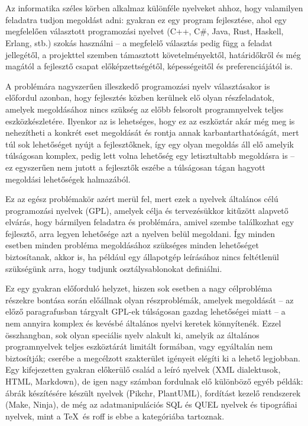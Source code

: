\chapter{\bevezetes}

Az informatika széles körben alkalmaz különféle nyelveket ahhoz, hogy valamilyen feladatra tudjon megoldást adni:
gyakran ez egy program fejlesztése, ahol egy megfelelően választott  programozási nyelvet (\pl C++, C\#, Java, Rust, Haskell, Erlang, stb.) szokás használni -- a megfelelő választás pedig függ a feladat jellegétől, a projekttel szemben támasztott követelményektől, határidőkről és még magától a fejlesztő csapat előképzettségétől, képességeitől és preferenciájától is.

A problémára nagyszerűen illeszkedő programozási nyelv választásakor is előfordul azonban, hogy fejlesztés közben kerülnek elő olyan részfeladatok, amelyek megoldásához nincs szükség az előbb felsorolt programnyelvek teljes eszközkészletére.
Ilyenkor az is lehetséges, hogy ez az eszköztár akár még meg is nehezítheti a konkrét eset megoldását és rontja annak karbantarthatóságát, mert túl sok lehetőséget nyújt a fejlesztőknek, így egy olyan megoldás áll elő amelyik túlságosan komplex, pedig lett volna lehetőség egy letisztultabb megoldásra is -- ez egyszerűen nem jutott a fejlesztők eszébe a túlságosan tágan hagyott megoldási lehetőségek halmazából.

Ez az egész problémakör azért merül fel, mert ezek a nyelvek \un általános célú programozási nyelvek (\gls{GPL}), amelyek célja és tervezésükkor kitűzött alapvető elvárás, hogy bármilyen feladatra és problémára, amivel szembe találkozhat egy fejlesztő, arra legyen lehetősége azt a nyelven belül megoldani.
Így minden esetben minden probléma megoldásához szükséges minden lehetőséget biztosítanak, akkor is, ha például egy állapotgép leírásához nincs feltétlenül szükségünk arra, hogy tudjunk osztálysablonokat definiálni.

Ez egy gyakran előforduló helyzet, hiszen sok esetben a nagy célprobléma részekre bontása során előállnak olyan részproblémák, amelyek megoldását -- az előző paragrafusban tárgyalt \gls{GPL}-ek túlságosan gazdag lehetőségei miatt -- a nem annyira komplex és kevésbé általános nyelvi keretek könnyítenék.
Ezzel összhangban, sok olyan speciális nyelv alakult ki, amelyik az általános programnyelvek teljes eszköztárát limitált formában, vagy egyáltalán nem biztosítják; cserébe a megcélzott szakterület igényeit elégíti ki a lehető legjobban.
Egy kifejezetten gyakran előkerülő család a leíró nyelvek (\gls{XML} dialektusok, \gls{HTML}, Markdown), de igen nagy számban fordulnak elő különböző egyéb példák: ábrák készítésére készült nyelvek (Pikchr, PlantUML), fordítást kezelő rendszerek (Make, Ninja), de még az adatmanipulációs SQL és QUEL nyelvek és tipográfiai nyelvek, mint a \TeX\ és roff is ebbe a kategóriába tartoznak.

